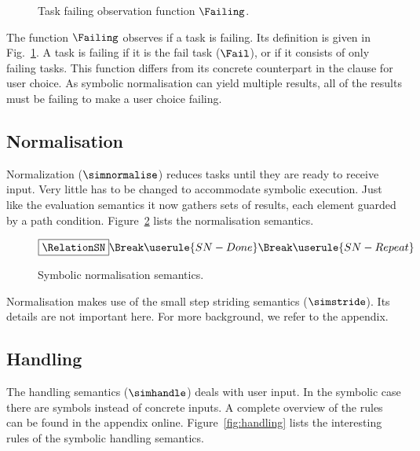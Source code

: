 \begin{figure}[ht]
  \small
  \begin{center}
  \end{center}
  \caption{Task failing observation function $\Failing$.}
  \label{fig:failing}
\end{figure}

The function $\Failing$ observes if a task is failing.
Its definition is given in Fig.~\ref{fig:failing}.
A task is failing if it is the fail task ($\Fail$), or if it consists of only failing tasks.
This function differs from its concrete counterpart in the clause for user choice.
As symbolic normalisation can yield multiple results, all of the results must be failing to make a user choice failing.



\subsection{Normalisation}

Normalization ($\simnormalise$) reduces tasks until they are ready to receive input.
Very little has to be changed to accommodate symbolic execution.
Just like the evaluation semantics it now gathers sets of results, each element guarded by a path condition.
Figure~\ref{fig:normalising} lists the normalisation semantics.

\begin{figure}[ht]
    \small
    \begin{gather*}
      \boxed{\RelationSN} \Break
      \userule{SN-Done} \Break
      \userule{SN-Repeat}
    \end{gather*}
  \caption{Symbolic normalisation semantics.}
  \label{fig:normalising}
\end{figure}

Normalisation makes use of the small step striding semantics ($\simstride$).
Its details are not important here.
For more background, we refer to the appendix.



\subsection{Handling}

The handling semantics ($\simhandle$) deals with user input.
In the symbolic case there are symbols instead of concrete inputs.
A complete overview of the rules can be found in the appendix online.
Figure~\ref{fig:handling} lists the interesting rules of the symbolic handling semantics.

